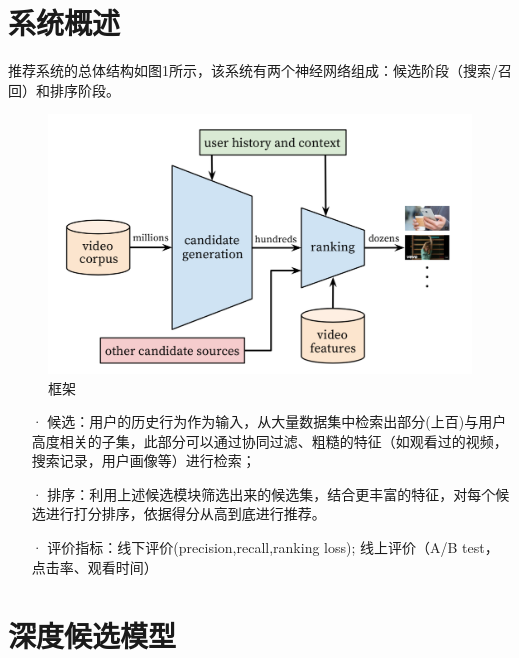 \documentclass[UTF8]{ctexart}
\begin{document}
	\section{系统概述}\label{sec:dierjie}
	推荐系统的总体结构如图1所示，该系统有两个神经网络组成：候选阶段（搜索/召回）和排序阶段。
	\begin{figure}[ht]
        \centering
        \includegraphics[scale=0.5]{picture/001.png}
        \caption{框架}
        \label{fig:001}
    \end{figure}
    \begin{itemize}
		\item[·] 候选：用户的历史行为作为输入，从大量数据集中检索出部分(上百)与用户高度相关的子集，此部分可以通过协同过滤、粗糙的特征（如观看过的视频，搜索记录，用户画像等）进行检索；
		\item[·] 排序：利用上述候选模块筛选出来的候选集，结合更丰富的特征，对每个候选进行打分排序，依据得分从高到底进行推荐。
		\item[·] 评价指标：线下评价(precision,recall,ranking loss); 线上评价（A/B test，点击率、观看时间）
	\end{itemize}
	\clearpage

	\section{深度候选模型}\label{sec:disanjie}
\end{document}
